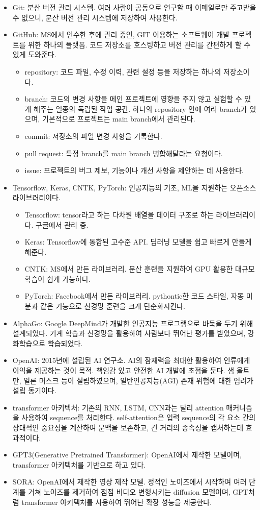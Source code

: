 \begin{itemize}
\item Git: 분산 버전 관리 시스템. 여러 사람이 공동으로 연구할 때 이메일로만 주고받을 수 없으니, 분산 버전 관리 시스템에 저장하여 사용한다.
\item GitHub: MS에서 인수한 후에 관리 중인, GIT 이용하는 소프트웨어 개발 프로젝트를 위한 하나의 플랫폼. 코드 저장소를 호스팅하고 버전 관리를 간편하게 할 수 있게 도와준다.
\begin{itemize}
  \item repository: 코드 파일, 수정 이력, 관련 설정 등을 저장하는 하나의 저장소이다.
  \item branch: 코드의 변경 사항을 메인 프로젝트에 영향을 주지 않고 실험할 수 있게 해주는 일종의 독립된 작업 공간. 하나의 repository 안에 여러 branch가 있으며, 기본적으로 프로젝트는 main branch에서 관리된다.
  \item commit: 저장소의 파일 변경 사항을 기록한다.
  \item pull request: 특정 branch를 main branch 병합해달라는 요청이다.
  \item issue: 프로젝트의 버그 제보, 기능이나 개선 사항을 제안하는 데 사용한다.
\end{itemize}

\item Tensorflow, Keras, CNTK, PyTorch: 인공지능의 기초, ML을 지원하는 오픈소스 라이브러리이다.
\begin{itemize}
  \item Tensorflow: tensor라고 하는 다차원 배열을 데이터 구조로 하는 라이브러리이다. 구글에서 관리 중.
  \item Keras: Tensorflow에 통합된 고수준 API. 딥러닝 모델을 쉽고 빠르게 만들게 해준다.
  \item CNTK: MS에서 만든 라이브러리. 분산 훈련을 지원하여 GPU 활용한 대규모 학습이 쉽게 가능하다.
  \item PyTorch: Facebook에서 만든 라이브러리. pythontic한 코드 스타일, 자동 미분과 같은 기능으로 신경망 훈련을 크게 단순화시킨다.
\end{itemize}
\item AlphaGo: Google DeepMind가 개발한 인공지능 프로그램으로 바둑을 두기 위해 설계되었다. 기계 학습과 신경망을 활용하여 사람보다 뛰어난 평가를 받았으며, 강화학습으로 학습되었다.

\item OpenAI: 2015년에 설립된 AI 연구소. AI의 잠재력을 최대한 활용하여 인류에게 이익을 제공하는 것이 목적. 책임감 있고 안전한 AI 개발에 초점을 둔다. 샘 올트만, 일론 머스크 등이 설립하였으며, 일반인공지능(AGI) 존재 위험에 대한 염려가 설립 동기이다.
\item transformer 아키텍처: 기존의 RNN, LSTM, CNN과는 달리 attention 매커니즘을 사용하여 sequence를 처리한다. self-attention은 입력 sequence의 각 요소 간의 상대적인 중요성을 계산하여 문맥을 보존하고, 긴 거리의 종속성을 캡처하는데 효과적이다.
\item GPT3(Generative Pretrained Transformer): OpenAI에서 제작한 모델이며, transformer 아키텍처를 기반으로 하고 있다.
\item SORA: OpenAI에서 제작한 영상 제작 모델. 정적인 노이즈에서 시작하여 여러 단계를 거쳐 노이즈를 제거하여 점점 비디오 변형시키는 diffusion 모델이며, GPT처럼 transformer 아키텍처를 사용하여 뛰어난 확장 성능을 제공한다.


\end{itemize}
